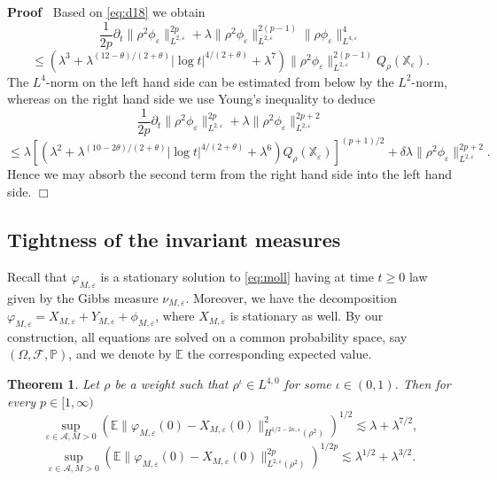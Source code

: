 \documentclass[a4paper,11pt]{article}
\newenvironment{proof}{\noindent\textbf{Proof\ }}{\hspace*{\fill}$\Box$\medskip}
\newtheorem{theorem}{Theorem}[section]
\numberwithin{equation}{section}
\begin{document}
\begin{proof}
  Based on {\eqref{eq:d18}} we obtain
  \[ \frac{1}{2 p} \partial_t \| \rho^2 \phi_{\varepsilon} \|_{L^{2,
     \varepsilon}}^{2 p} + \lambda \| \rho^2 \phi_{\varepsilon} \|_{L^{2,
     \varepsilon}}^{2 (p - 1)} \| \rho \phi_{\varepsilon} \|_{L^{4,
     \varepsilon}}^4 
     \]
     \[
     \leqslant (\lambda^3 + \lambda^{(12 - \theta)
     / (2 + \theta)} | \log t|^{4 / (2 + \theta)} + \lambda^{7}) \| \rho^2 \phi_{\varepsilon}
     \|_{L^{2, \varepsilon}}^{2 (p - 1)} Q_{\rho} (\mathbb{X}_{\varepsilon}) .
  \]
  The $L^4$-norm on the left hand side can be estimated from below by the
  $L^2$-norm, whereas on the right hand side we use Young's inequality to
  deduce
  \[ \frac{1}{2 p} \partial_t \| \rho^2 \phi_{\varepsilon} \|_{L^{2,
     \varepsilon}}^{2 p} + \lambda \| \rho^2 \phi_{\varepsilon} \|_{L^{2,
     \varepsilon}}^{2 p + 2}
     \]
     \[
      \leqslant \lambda [(\lambda^{2} + \lambda^{(10 - 2\theta)
     / (2 + \theta)} | \log t|^{4 / (2 + \theta)} + \lambda^{6}) Q_{\rho}
     (\mathbb{X}_{\varepsilon})]^{(p + 1) / 2} + \delta \lambda \| \rho^2
     \phi_{\varepsilon} \|_{L^{2, \varepsilon}}^{2 p + 2} .\]
Hence we may absorb the second term from the right hand side into the left hand
  side.
\end{proof}

\subsection{Tightness of the invariant measures}

\label{ss:tight}Recall that $\varphi_{M, \varepsilon}$ is a stationary
solution to {\eqref{eq:moll}} having at time $t \geqslant 0$ law given by the
Gibbs measure $\nu_{M, \varepsilon}$. Moreover, we have the decomposition
$\varphi_{M, \varepsilon} = X_{M, \varepsilon} + Y_{M, \varepsilon} + \phi_{M,
\varepsilon}$, where $X_{M, \varepsilon}$ is stationary as well. By our construction, all equations are solved on a common
probability space, say $(\Omega, \mathcal{F}, \mathbb{P})$, and we denote by
$\mathbb{E}$ the corresponding expected value.

\begin{theorem}
  \label{thm:tight}Let $\rho$ be a weight such that $\rho^{\iota} \in L^{4,
  0}$ for some $\iota \in (0, 1)$. Then for every $p \in [1, \infty)$
  \[ \sup_{\varepsilon \in \mathcal{A}, M > 0} (\mathbb{E} \| \varphi_{M,
     \varepsilon} (0) - X_{M, \varepsilon} (0) \|_{H^{1 / 2 - 2 \kappa,
     \varepsilon} (\rho^2)}^2)^{1/2}\lesssim {\lambda} +  \lambda^{7/2},\]
  \[    \sup_{\varepsilon \in \mathcal{A}, M > 0}   (\mathbb{E} \| \varphi_{M,
     \varepsilon} (0) - X_{M, \varepsilon} (0) \|_{L^{2, \varepsilon}
     (\rho^2)}^{2 p})^{1/2p}\lesssim {\lambda^{1/2}} +  {\lambda^{3/2}}.\]
\end{theorem}
\end{document}
